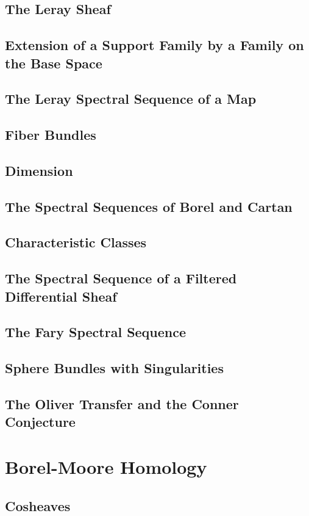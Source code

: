 \subsection{The Leray Sheaf}
\subsection{Extension of a Support Family by a Family on the Base Space}
\subsection{The Leray Spectral Sequence of a Map}
\subsection{Fiber Bundles}
\subsection{Dimension}
\subsection{The Spectral Sequences of Borel and Cartan}
\subsection{Characteristic Classes}
\subsection{The Spectral Sequence of a Filtered Differential Sheaf}
\subsection{The Fary Spectral Sequence}
\subsection{Sphere Bundles with Singularities}
\subsection{The Oliver Transfer and the Conner Conjecture}

\section{Borel-Moore Homology}
\subsection{Cosheaves}
